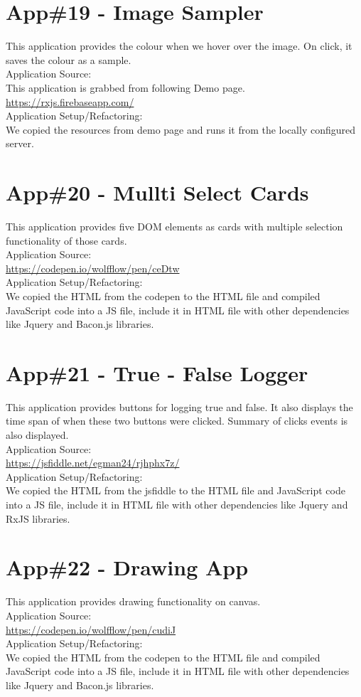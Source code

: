 \section{App\#19 - Image Sampler}
This application provides the colour when we hover over the image. On click, it saves the colour as a sample.\\
Application Source: \\
This application is grabbed from following Demo page.\\
\url{https://rxjs.firebaseapp.com/}\\
Application Setup/Refactoring: \\
We copied the resources from demo page and runs it from the locally configured server.


\section{App\#20 - Mullti Select Cards }
This application provides five DOM elements as cards with multiple selection functionality of those cards.\\
Application Source: \\
\url{https://codepen.io/wolfflow/pen/ceDtw}\\
Application Setup/Refactoring: \\
We copied the HTML from the codepen to the HTML file and compiled JavaScript code into a JS file, include it in HTML file with other dependencies like Jquery and Bacon.js libraries.

\section{App\#21 - True - False Logger }
This application provides buttons for logging true and false. It also displays the time span of when these two buttons were clicked. Summary of clicks events is also displayed. \\
Application Source: \\
\url{https://jsfiddle.net/egman24/rjhphx7z/}\\
Application Setup/Refactoring: \\
We copied the HTML from the jsfiddle to the HTML file and JavaScript code into a JS file, include it in HTML file with other dependencies like Jquery and RxJS libraries.

\section{App\#22 - Drawing App }
This application provides drawing functionality on canvas.\\
Application Source: \\
\url{https://codepen.io/wolfflow/pen/cudiJ}\\
Application Setup/Refactoring: \\
We copied the HTML from the codepen to the HTML file and compiled JavaScript code into a JS file, include it in HTML file with other dependencies like Jquery and Bacon.js libraries.
